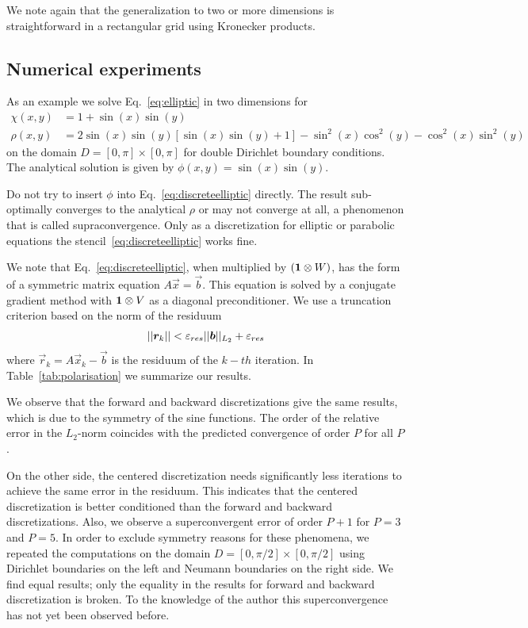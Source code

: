 We note again that the generalization to two or more dimensions is straightforward
in a rectangular grid using Kronecker products.
\subsection{Numerical experiments} \label{sec:ellipticexperiments}
As an example we solve Eq.~\eqref{eq:elliptic} in two dimensions for 
\begin{align*}
\chi(x,y) &= 1 + \sin(x)\sin(y)\\
\rho(x,y) &= 2\sin(x)\sin(y)\left[\sin(x)\sin(y)+1\right]-\sin^2(x)\cos^2(y)-\cos^2(x)\sin^2(y)
    \label{}
\end{align*}
on the domain $D=[ 0, \pi]\times[0,\pi]$ for double Dirichlet boundary conditions. 
The analytical solution is given by $\phi(x,y) = \sin(x)\sin(y)$.  

Do not try to insert $\phi$ into Eq.~\eqref{eq:discreteelliptic} directly. The result sub-optimally converges to the analytical $\rho$ or may not converge at all, a phenomenon that is called supraconvergence. Only as a discretization for 
elliptic or parabolic equations the stencil~\eqref{eq:discreteelliptic} works fine. 

We note that Eq.~\eqref{eq:discreteelliptic}, when multiplied by $(\mathbf{1}\otimes W)$, has the form of a symmetric matrix equation
$A\vec x=\vec b$. 
This equation is solved by a conjugate gradient method with
$\mathbf{1}\otimes V$ as a diagonal preconditioner. 
We use a truncation criterion based on the norm of the residuum
\begin{align}
    ||{\boldsymbol{r}}_k|| < \varepsilon_{res}||{\boldsymbol{b}}||_{L_2} + \varepsilon_{res}
    \label{}
\end{align}
where $\vec r_k=A\vec x_k - \vec b$ is the residuum of
the $k-th$ iteration. In Table~\ref{tab:polarisation} we summarize our results.

We observe that the forward and backward discretizations give the same results, 
which is due to the symmetry of the sine functions. The order of the 
relative error in the $L_2$-norm coincides with the predicted convergence of order $P$
for all $P$. 

On the other side, the centered discretization needs significantly less iterations
to achieve the same error in the residuum. This indicates that the centered
discretization is better conditioned than the forward and backward discretizations. 
Also, we observe a superconvergent error of order $P+1$ for $P=3$ and $P=5$. In order to exclude symmetry reasons for these
phenomena, we repeated the computations on the domain $D=[0, \pi/2]\times[0,\pi/2]$ using Dirichlet boundaries on the left
and Neumann boundaries on the right side. We find 
equal results; only
the equality in the results for forward and 
backward discretization is broken. 
To the knowledge of the author this superconvergence has not yet been observed before. 

